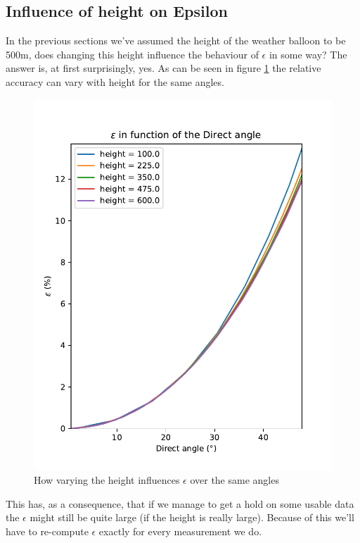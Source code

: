 \documentclass[11pt,a4paper,faculty=we,language=en,doctype=report]{cls/ugent-doc}
\begin{document}
\subsection{Influence of height on Epsilon}
In the previous sections we've assumed the height of the weather balloon to be
500m, does changing this height influence the behaviour of $\epsilon$ in some
way?  The answer is, at first surprisingly, yes. As can be seen in figure
\ref{fig:EpsWithHeight} the relative accuracy can vary with height for the same angles.
\begin{figure}
	\centering
	\includegraphics[height=0.4\textheight]{figures/EpsilonWithHeight.pdf}
	\caption{How varying the height influences $\epsilon$ over the same angles}
	\label{fig:EpsWithHeight}
\end{figure}
This has, as a consequence, that if we manage to get a hold on some
usable data the $\epsilon$
might still be quite large (if the height is really large).
Because of this we'll have to re-compute $\epsilon$ exactly for 
every measurement we do.
\end{document}
